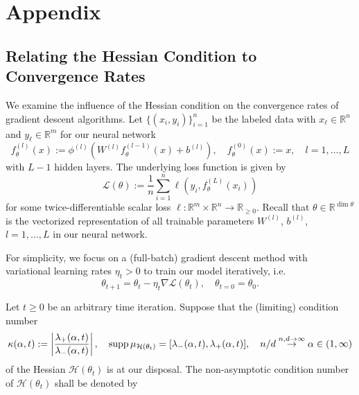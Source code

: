 \documentclass{article}
\begin{document}
\newpage
\appendix
\section*{Appendix}
\renewcommand{\thesubsection}{\Alph{subsection}}
\setcounter{equation}{0}
\renewcommand{\theequation}{A.\arabic{equation}}

\subsection{Relating the Hessian Condition to Convergence Rates} \label{sec:appendix_optimization}
We examine the influence of the Hessian condition on the convergence rates of gradient descent algorithms. Let $\{(x_i,y_i)\}_{i=1}^n$ be the labeled data with $x_\ell\in\mathbb{R}^n$ and $y_\ell\in\mathbb{R}^m$ for our neural network
\begin{equation}
f_\theta^{(l)}(x):=\phi^{(l)}(W^{(l)}f_\theta^{(l-1)}(x)+b^{(l)}),\quad f_\theta^{(0)}(x):=x,\quad l=1,\dots,L
\end{equation}
with $L-1$ hidden layers. The underlying loss function is given by
\begin{equation}
\mathcal{L}(\theta):=\frac{1}{n}\sum_{i=1}^n\ell(y_i,f_\theta^{(L)}(x_i))\label{eq:loss-A}
\end{equation}
for some twice-differentiable scalar loss $\ell:\mathbb{R}^m\times\mathbb{R}^n\to\mathbb{R}_{\geq0}$. Recall that $\theta\in\mathbb{R}^{\dim\theta}$ is the vectorized representation of all trainable parameters $W^{(l)}$, $b^{(l)}$, $l=1,\dots,L$ in our neural network.
\par
For simplicity, we focus on a (full-batch) gradient descent method with variational learning rates $\eta_t>0$ to train our model iteratively, i.e.
\begin{equation}
\theta_{t+1}=\theta_t-\eta_t\nabla\mathcal{L}(\theta_t),\quad \theta_{t=0}=\theta_0.
\end{equation}
\par
Let $t\geq0$ be an arbitrary time iteration. Suppose that the (limiting) condition number 
\begin{equation}
\kappa(\alpha,t):=\left|\frac{\lambda_+(\alpha,t)}{\lambda_-(\alpha,t)}\right|,\quad \operatorname{supp}\mu_{\mathcal{H}(\theta_t)}=[\lambda_-(\alpha,t),\lambda_+(\alpha,t)],\quad n/d\stackrel{n,d\to\infty}{\to}\alpha\in(1,\infty) \notag
\end{equation}
of the Hessian $\mathcal{H}(\theta_t)$ is at our disposal. The non-asymptotic condition number of $\mathcal{H}(\theta_t)$ shall be denoted by
\end{document}
